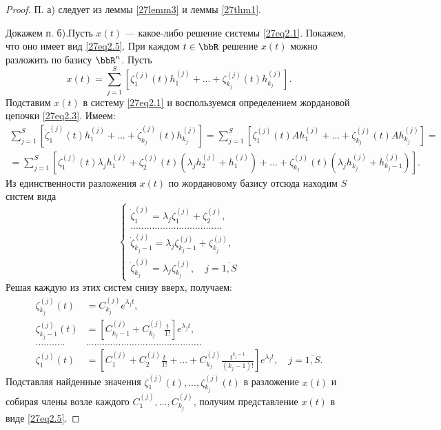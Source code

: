 \begin{proof}
П. а) следует из леммы \ref{27lemm3} и леммы \ref{27thm1}. 

Докажем п. б).Пусть $x(t)$ --- какое-либо решение системы \eqref{27eq2.1}. Покажем, что оно имеет вид \eqref{27eq2.5}. При каждом $t\in\bbR$ решение $x(t)$ можно разложить по базису $\bbR^n$. Пусть
$$
x(t)=\sum\limits_{j=1}^S\left[\zeta_1^{(j)}(t)h_1^{(j)}+...+\zeta_{k_j}^{(j)}(t)h_{k_j}^{(j)}\right].
$$
Подставим $x(t)$ в систему \eqref{27eq2.1} и воспользуемся определением жордановой цепочки \eqref{27eq2.3}. Имеем:
\begin{multline*}
\sum\limits_{j=1}^S\left[\dot\zeta_1^{(j)}(t)h_1^{(j)}+...+\dot\zeta_{k_j}^{(j)}(t)h_{k_j}^{(j)}\right]=\sum\limits_{j=1}^S\left[\zeta_1^{(j)}(t)Ah_1^{(j)}+...+\zeta_{k_j}^{(j)}(t)Ah_{k_j}^{(j)}\right]=\\=\sum\limits_{j=1}^S\left[\zeta_1^{(j)}(t)\lambda_jh_1^{(j)}+\zeta_2^{(j)}(t)\left(\lambda_jh_2^{(j)}+h_1^{(j)}\right)+...+\zeta_{k_j}^{(j)}(t)\left(\lambda_jh_{k_j}^{(j)}+h_{k_j-1}^{(j)}\right)\right].
\end{multline*}
Из единственности разложения $x(t)$ по жордановому базису отсюда находим $S$ систем вида
$$
\begin{cases}
\dot{\zeta}_1^{(j)}=\lambda_j\zeta_1^{(j)}+\zeta_2^{(j)},\\
..................................\\
\dot{\zeta}_{k_j-1}^{(j)}=\lambda_j\zeta_{k_j-1}^{(j)}+\zeta_{k_j}^{(j)},\\
\dot{\zeta}_{k_j}^{(j)}=\lambda_j\zeta_{k_j}^{(j)},\quad j=\overline{1,S}
\end{cases}
$$
Решая каждую из этих систем снизу вверх, получаем:
$$
\begin{aligned}
\zeta_{k_j}^{(j)}(t)&=C_{k_j}^{(j)}e^{\lambda_jt},\\
\zeta_{k_j-1}^{(j)}(t)&=\left[C_{k_j-1}^{(j)}+C_{k_j}^{(j)}\frac{t}{1!}\right]e^{\lambda_j t},\\
...........&...........................................\\
\zeta_1^{(j)}(t)&=\left[C_1^{(j)}+C_2^{(j)}\frac{t}{1!}+...+C_{k_j}^{(j)}\frac{t^{k_j-1}}{(k_j-1)!}\right]e^{\lambda_jt},\quad j=\overline{1,S}.
\end{aligned}
$$
Подставляя найденные значения $\zeta_1^{(j)}(t),...,\zeta_{k_j}^{(j)}(t)$ в разложение $x(t)$ и собирая члены возле каждого $C_1^{(j)},...,C_{k_j}^{(j)}$, получим представление $x(t)$ в виде \eqref{27eq2.5}.
\end{proof}







